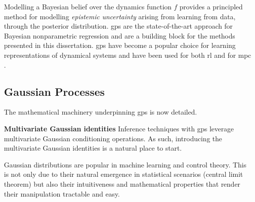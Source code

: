 \documentclass{mimosis-class/mimosis}
\numberwithin{equation}{chapter}
\begin{document}
Modelling a Bayesian belief over the dynamics function \(f\) provides a principled method for modelling
\emph{epistemic uncertainty} arising from learning from data, through the posterior distribution.
\acrshort{gps} are the state-of-the-art approach for Bayesian nonparametric regression and
are a building block for the methods presented in this dissertation.
\acrshort{gps} have become a popular choice for learning representations of dynamical systems
\citep{nguyen-tuongModel2009,buisson-fenetActively2020,wangSafe2018}
and have been used for both \acrshort{rl}
\citep{deisenrothPILCO2011,doerrOptimizing2017,vinogradskaNumerical2020,polymenakosSafe2019}
and for \acrshort{mpc}
\citep{kollerLearningBased2018,hewingCautious2020,hewingLearningBased2020,kollerLearningBased2018,kamtheDataEfficient2018}.

\subsection{Gaussian Processes}
\label{sec:orgc2501ea}
The mathematical machinery underpinning \acrshort{gps} is now detailed.

\textbf{Multivariate Gaussian identities}
Inference techniques with \acrshort{gps} leverage multivariate Gaussian conditioning operations.
As such, introducing the multivariate Gaussian identities is a natural place to start.

Gaussian distributions are popular in machine learning and control theory. This is not only due to their
natural emergence in statistical scenarios (central limit theorem) but also their intuitiveness and
mathematical properties that render their manipulation tractable and easy.
\end{document}
